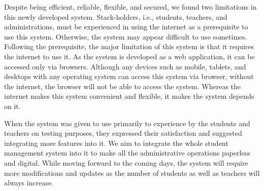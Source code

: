Despite being efficient, reliable, flexible, and secured, we found two limitations in this newly developed system. Stack-holders, i.e., students, teachers, and administrations, must be experienced in using the internet as a prerequisite to use this system. Otherwise, the system may appear difficult to use sometimes. Following the prerequisite, the major limitation of this system is that it requires the internet to use it. As the system is developed as a web application, it can be accessed only via browsers. Although any devices such as mobile, tablets, and desktops with any operating system can access this system via browser, without the internet, the browser will not be able to access the system. Whereas the internet makes this system convenient and flexible, it makes the system depends on it. 

When the system was given to use primarily to experience by the students and teachers on testing purposes, they expressed their satisfaction and suggested integrating more features into it. We aim to integrate the whole student management system into it to make all the administrative operations paperless and digital. While moving forward to the coming days, the system will require more modifications and updates as the number of students as well as teachers will always increase. 

\clearpage